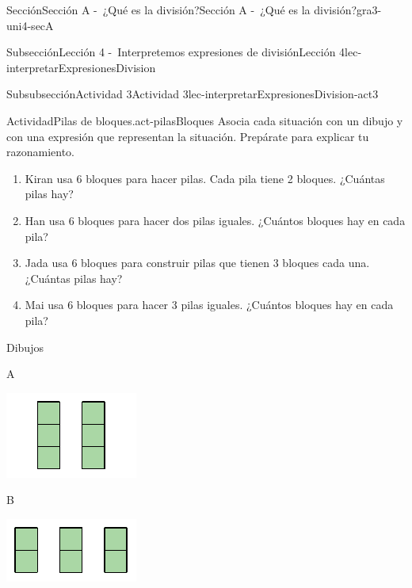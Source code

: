 \documentclass[twoside,10pt,]{article}
\begin{document}
\begin{sectionptx}{Sección}{Sección A -~¿Qué es la división?}{}{Sección A -~¿Qué es la división?}{}{}{gra3-uni4-secA}
\begin{subsectionptx}{Subsección}{Lección 4 -~Interpretemos expresiones de división}{}{Lección 4}{}{}{lec-interpretarExpresionesDivision}
\begin{subsubsectionptx}{Subsubsección}{Actividad 3}{}{Actividad 3}{}{}{lec-interpretarExpresionesDivision-act3}
\begin{activity}{Actividad}{Pilas de bloques.}{act-pilasBloques}%
Asocia cada situación con un dibujo y con una expresión que representan la situación. Prepárate para explicar tu razonamiento.%
%
\begin{enumerate}
\item{}Kiran usa 6 bloques para hacer pilas. Cada pila tiene 2 bloques. ¿Cuántas pilas hay?%
\item{}Han usa 6 bloques para hacer dos pilas iguales. ¿Cuántos bloques hay en cada pila?%
\item{}Jada usa 6 bloques para construir pilas que tienen 3 bloques cada una. ¿Cuántas pilas hay?%
\item{}Mai usa 6 bloques para hacer 3 pilas iguales. ¿Cuántos bloques hay en cada pila?%
\end{enumerate}
Dibujos%
\begin{sidebyside}{2}{0.05}{0.05}{0.1}%
\begin{sbspanel}{0.4}%
A%
\par
\includegraphics[width=\linewidth]{external/svg-source/tikz-file-149316.pdf}
\end{sbspanel}%
\begin{sbspanel}{0.4}%
B%
\par
\includegraphics[width=\linewidth]{external/svg-source/tikz-file-149317.pdf}

\end{sbspanel}
\end{sidebyside}
\end{activity}
\end{subsubsectionptx}
\end{subsectionptx}
\end{sectionptx}
\end{document}

